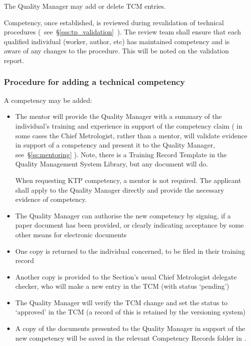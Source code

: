 The Quality Manager may add or delete TCM entries. 

Competency, once established, is reviewed during revalidation of technical procedures (~see~\S\ref{sss:tp_validation}~).  The review team shall ensure that each qualified individual (worker, author, etc) has maintained competency and is aware of any changes to the procedure. This will be noted on the validation report. 

\subsubsection{Procedure for adding a technical competency}
\label{sss:tcm_procedure}
A competency may be added:
\begin{itemize}
\item The mentor will provide the Quality Manager with a summary of the individual's training and experience in support of the competency claim ( in some cases the Chief Metrologist, rather than a mentor, will validate evidence in support of a competency and present it to the Quality Manager, see~\S\ref{ss:mentoring} ). Note, there is a Training Record Template in the  Quality Management System Library, but any document will do.

When requesting KTP competency, a mentor is not required. The applicant shall apply to the Quality Manager directly and provide the necessary evidence of competency.

\item The Quality Manager can authorise the new competency by signing, if a paper document has been provided, or clearly indicating acceptance by some other means for electronic documents 

\item One copy is returned to the individual concerned, to be filed in their training record

\item Another copy is provided to the Section's usual Chief Metrologist delegate checker, who will make a new entry in the TCM (with status ‘pending')

\item The Quality Manager will verify the TCM change and set the status to ‘approved' in the TCM (a record of this is retained by the  versioning system)

\item A copy of the documents presented to the Quality Manager in support of the new competency will be saved in the relevant Competency Records folder in .
\end{itemize}

